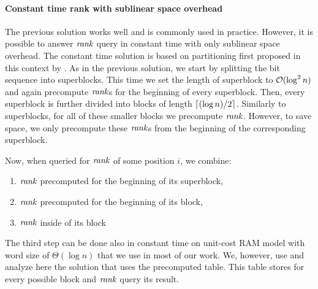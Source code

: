 \paragraph{Constant time rank with sublinear space overhead}

The previous solution works well and is commonly used in practice. However, it is possible to
answer $\mathit{rank}$ query in constant time with only sublinear space overhead. The constant time
solution is based on partitioning first proposed in this context by \cite{okanohara2007practical}.
As in the previous solution, we start by splitting the bit sequence into superblocks. This time
we set the length of superblock to $\mathcal{O}(\log^2 n)$ and again precompute $\mathit{rank}$s for the beginning of
every superblock. Then, every superblock is further divided into blocks of length $\left\lceil (\log n)/2 \right\rceil$.
Similarly to superblocks, for all of these smaller blocks we precompute $\mathit{rank}$. However, to save space,
we only precompute these $\mathit{rank}$s from the beginning of the corresponding superblock.

Now, when queried for $\mathit{rank}$ of some position $i$, we combine:
\begin{enumerate}
    \item $\mathit{rank}$ precomputed for the beginning of its superblock,
    \item $\mathit{rank}$ precomputed for the beginning of its block,
    \item $\mathit{rank}$ inside of its block
\end{enumerate}

The third step can be done also in constant time on unit-cost RAM model with word size of $\Theta(\log n)$
that we use in most of our work. We, however, use and analyze here the solution that uses the precomputed table.
This table stores for every possible block and $\mathit{rank}$ query its result. 

